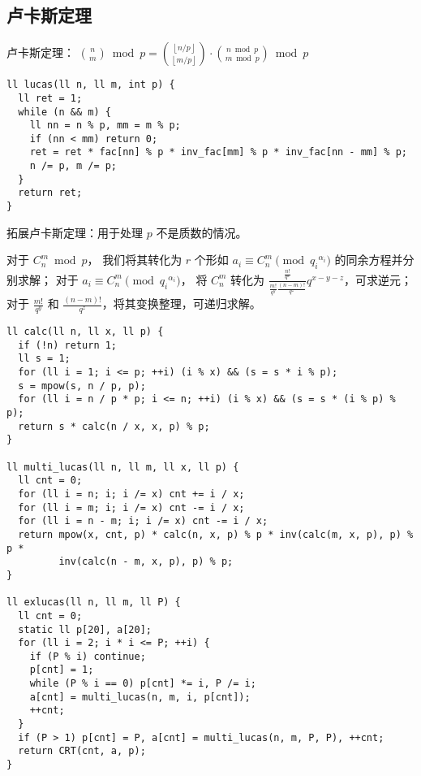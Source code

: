 \subsection{卢卡斯定理}
卢卡斯定理：
$\binom{n}{m}\bmod p = \binom{\left\lfloor n/p \right\rfloor}{\left\lfloor m/p\right\rfloor}\cdot\binom{n\bmod p}{m\bmod p}\bmod p$
\begin{lstlisting}
ll lucas(ll n, ll m, int p) {
  ll ret = 1;
  while (n && m) {
    ll nn = n % p, mm = m % p;
    if (nn < mm) return 0;
    ret = ret * fac[nn] % p * inv_fac[mm] % p * inv_fac[nn - mm] % p;
    n /= p, m /= p;
  }
  return ret;
}
\end{lstlisting}

拓展卢卡斯定理：用于处理 $p$ 不是质数的情况。

对于 $C_n^m \bmod p$，
我们将其转化为 $r$ 个形如 $a_i\equiv C_n^m \pmod{{q_i}^{\alpha_i}}$ 的同余方程并分别求解；
对于 $a_i\equiv C_n^m \pmod{{q_i}^{\alpha_i}}$，
将 $C_n^m$ 转化为 $\frac{\frac{n!}{q^x}}{\frac{m!}{q^y}\frac{(n-m)!}{q^z}}q^{x-y-z}$，可求逆元；
对于 $\frac{m!}{q^y}$ 和 $\frac{(n-m)!}{q^z}$，将其变换整理，可递归求解。
\begin{lstlisting}
ll calc(ll n, ll x, ll p) {
  if (!n) return 1;
  ll s = 1;
  for (ll i = 1; i <= p; ++i) (i % x) && (s = s * i % p);
  s = mpow(s, n / p, p);
  for (ll i = n / p * p; i <= n; ++i) (i % x) && (s = s * (i % p) % p);
  return s * calc(n / x, x, p) % p;
}

ll multi_lucas(ll n, ll m, ll x, ll p) {
  ll cnt = 0;
  for (ll i = n; i; i /= x) cnt += i / x;
  for (ll i = m; i; i /= x) cnt -= i / x;
  for (ll i = n - m; i; i /= x) cnt -= i / x;
  return mpow(x, cnt, p) * calc(n, x, p) % p * inv(calc(m, x, p), p) % p *
         inv(calc(n - m, x, p), p) % p;
}

ll exlucas(ll n, ll m, ll P) {
  ll cnt = 0;
  static ll p[20], a[20];
  for (ll i = 2; i * i <= P; ++i) {
    if (P % i) continue;
    p[cnt] = 1;
    while (P % i == 0) p[cnt] *= i, P /= i;
    a[cnt] = multi_lucas(n, m, i, p[cnt]);
    ++cnt;
  }
  if (P > 1) p[cnt] = P, a[cnt] = multi_lucas(n, m, P, P), ++cnt;
  return CRT(cnt, a, p);
}
\end{lstlisting}